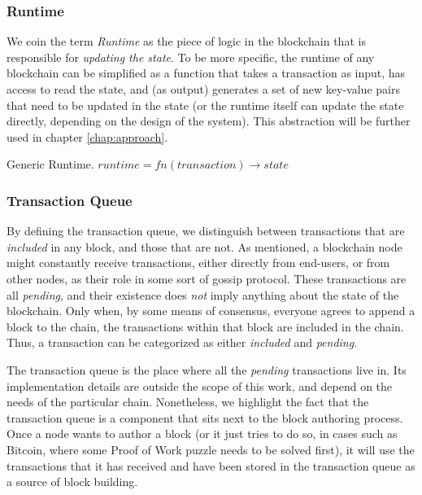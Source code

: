\subsubsection{Runtime} \label{chap_bg:subsec:runtime}


We coin the term \textit{Runtime} as the piece of logic in the blockchain that is responsible for
\textit{updating the state}. To be more specific, the runtime of any blockchain can be simplified as
a function that takes a transaction as input, has access to read the state, and (as output)
generates a set of new key-value pairs that need to be updated in the state (or the runtime itself
can update the state directly, depending on the design of the system). This abstraction will be
further used in chapter \ref{chap:approach}.

\begin{definition} Generic Runtime. $runtime = fn(transaction) \rightarrow state$
\end{definition}

\subsubsection{Transaction Queue} \label{chap_bg:subsec:tx_queue}

By defining the transaction queue, we distinguish between transactions that are \textit{included} in
any block, and those that are not. As mentioned, a blockchain node might constantly receive
transactions, either directly from end-users, or from other nodes, as their role in some sort of
gossip protocol. These transactions are all \textit{pending}, and their existence does \textit{not}
imply anything about the state of the blockchain. Only when, by some means of consensus, everyone
agrees to append a block to the chain, the transactions within that block are included in the chain.
Thus, a transaction can be categorized as either \textit{included} and \textit{pending}.

The transaction queue is the place where all the \textit{pending} transactions live in. Its
implementation details are outside the scope of this work, and depend on the needs of the particular
chain. Nonetheless, we highlight the fact that the transaction queue is a component that sits next
to the block authoring process. Once a node wants to author a block (or it just tries to do so, in
cases such as Bitcoin, where some Proof of Work puzzle needs to be solved first), it will use the
transactions that it has received and have been stored in the transaction queue as a source of block
building.

